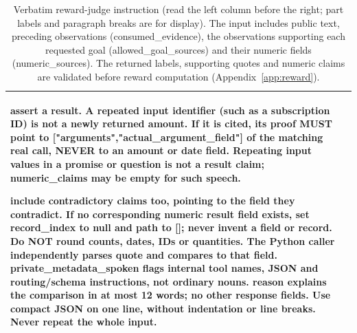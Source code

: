 \begin{table}[tp]
\begin{tabular}{@{}
  >{\raggedright\arraybackslash}p{}
  @{\hspace{8pt}{\color{black!22}\vrule width 0.35pt}\hspace{8pt}}
  >{\raggedright\arraybackslash}p{}
@{}}
assert a result. A repeated input identifier (such as a subscription ID) is not a newly returned amount. If it is cited, its proof MUST point to ["arguments","actual\_argument\_field"] of the matching real call, NEVER to an amount or date field. Repeating input values in a promise or question is not a result claim; numeric\_claims may be empty for such speech.\par\smallskip include contradictory claims too, pointing to the field they contradict. If no corresponding numeric result field exists, set record\_index to null and path to []; never invent a field or record. Do NOT round counts, dates, IDs or quantities. The Python caller independently parses quote and compares to that field. private\_metadata\_spoken flags internal tool names, JSON and routing/schema instructions, not ordinary nouns. reason explains the comparison in at most 12 words; no other response fields. Use compact JSON on one line, without indentation or line breaks. Never repeat the whole input. \\
\bottomrule
\end{tabular}
\caption{Verbatim reward-judge instruction (read the left column before the right; part labels and paragraph breaks are for display). The input includes public text, preceding observations (consumed\_evidence), the observations supporting each requested goal (allowed\_goal\_sources) and their numeric fields (numeric\_sources). The returned labels, supporting quotes and numeric claims are validated before reward computation (Appendix~\ref{app:reward}).}
\label{tab:judge}
\end{table}
